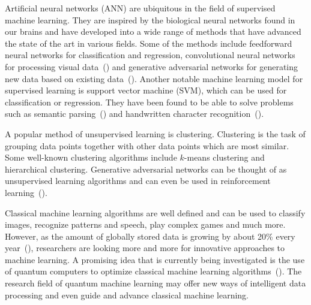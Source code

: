 \documentclass[a4paper,10pt]{article}
\begin{document}
Artificial neural networks (ANN) are ubiquitous in the field of supervised machine learning.
They are inspired by the biological neural networks found in our brains and have developed into a wide range of methods that have advanced the state of the art in various fields.
Some of the methods include feedforward neural networks for classification and regression, convolutional neural networks for processing visual data~(\cite{cirecsan2012multi}) and generative adversarial networks for generating new data based on existing data~(\cite{goodfellow2014generative}).
Another notable machine learning model for supervised learning is support vector machine (SVM), which can be used for classification or regression.
They have been found to be able to solve problems such as semantic parsing~(\cite{pradhan2004shallow}) and handwritten character recognition~(\cite{decoste2002training}).

A popular method of unsupervised learning is clustering.
Clustering is the task of grouping data points together with other data points which are most similar.
Some well-known clustering algorithms include $k$-means clustering and hierarchical clustering.
Generative adversarial networks can be thought of as unsupervised learning algorithms and can even be used in reinforcement learning~(\cite{ho2016generative}).

Classical machine learning algorithms are well defined and can be used to classify images, recognize patterns and speech, play complex games and much more.
However, as the amount of globally stored data is growing by about 20\% every year~(\cite{hilbert2011world}), researchers are looking more and more for innovative approaches to machine learning.
A promising idea that is currently being investigated is the use of quantum computers to optimize classical machine learning algorithms~(\cite{schuld2015introduction}).
The research field of quantum machine learning may offer new ways of intelligent data processing and even guide and advance classical machine learning.
\end{document}
